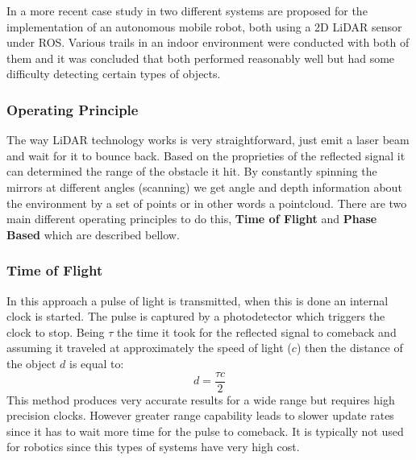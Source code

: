 In a more recent case study in \cite{lidar2019ros} two different systems are proposed for the implementation of an autonomous  mobile robot, both using a 2D \ac{LiDAR} sensor under \ac{ROS}. Various trails in an indoor environment were conducted with both of them and it was concluded that both performed reasonably well but had some difficulty detecting certain types of objects.  

\subsubsection{Operating Principle}
The way \ac{LiDAR} technology works is very straightforward, just emit a laser beam and wait for it to bounce back. Based on the proprieties of the reflected signal it can determined the range of the obstacle it hit. By constantly spinning the mirrors at different angles (scanning) we get angle and depth information about the environment  by a  set of points or in other words a pointcloud. There are two main different operating principles to do this, \textbf{Time of Flight} and \textbf{Phase Based} which are described bellow.
\subsubsection*{Time of Flight}
 In this approach a pulse of light is transmitted, when this is done an internal clock is started. The pulse is captured by a photodetector which triggers the clock to stop. Being $\tau$ the time it took for the reflected signal to  comeback and assuming it traveled at approximately the speed of light ($c$) then the distance of the object $d$ is equal to:
\begin{equation}
    d=\frac{\tau c}{2}
\end{equation}
This method produces very accurate results for a wide range but requires high precision clocks. However greater  range capability leads to slower update rates since it has to wait more time for the pulse to comeback.
It is typically not used for robotics since this types of systems have very high cost.
